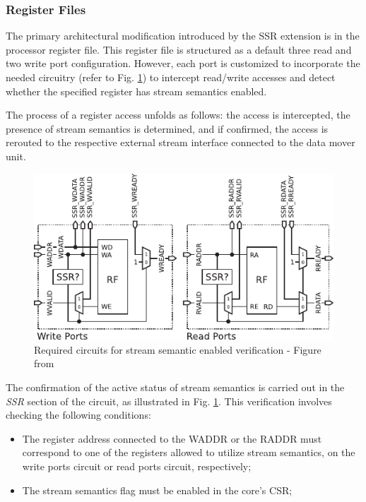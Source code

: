 \subsubsection{Register Files}

The primary architectural modification introduced by the SSR extension is in the processor register file. This register file is structured as a default three read and two write port configuration. However, each port is customized to incorporate the needed circuitry (refer to Fig. \ref{fig:ssr-stream_enable_check}) to intercept read/write accesses and detect whether the specified register has stream semantics enabled.

The process of a register access unfolds as follows: the access is intercepted, the presence of stream semantics is determined, and if confirmed, the access is rerouted to the respective external stream interface connected to the data mover unit.

\begin{figure}[H]
	\begin{center}
 		\includegraphics[width=0.67\linewidth]{images/ssr-circuitry.pdf}
 		\caption{Required circuits for stream semantic enabled verification  - Figure from \cite{9068465}}
 		\label{fig:ssr-stream_enable_check}
	\end{center} 
\end{figure}

The confirmation of the active status of stream semantics is carried out in the \textit{SSR} section of the circuit, as illustrated in Fig. \ref{fig:ssr-stream_enable_check}. This verification involves checking the following conditions:

\begin{itemize}
\item[1] The register address connected to the WADDR or the RADDR must correspond to one of the registers allowed to utilize stream semantics, on the write ports circuit or read ports circuit, respectively;
\item[2] The stream semantics flag must be enabled in the core's CSR;
\end{itemize}

